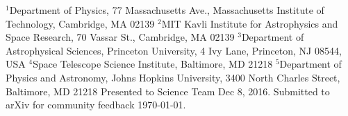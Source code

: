 {\tiny\noindent
$^1$Department of Physics, 77 Massachusetts Ave., Massachusetts 
Institute of Technology, Cambridge, MA 02139\newline
\noindent$^2$MIT Kavli Institute for Astrophysics and Space Research, 70 Vassar
St., Cambridge, MA 02139\newline
\noindent$^3$Department of Astrophysical Sciences, Princeton University, 4 Ivy 
Lane, Princeton, NJ 08544, USA\newline	
\noindent$^4$Space Telescope Science Institute, Baltimore, MD 21218\newline
\vspace{0cm} \noindent$^5$Department of Physics and Astronomy, Johns 
Hopkins 
University, 3400 North Charles Street, Baltimore, MD 21218 \newline
\noindent\vspace{-0.222cm}Presented to \tess Science Team Dec 8, 2016. 
Submitted to arXiv for community feedback \today.}
\vspace{-0.1cm}